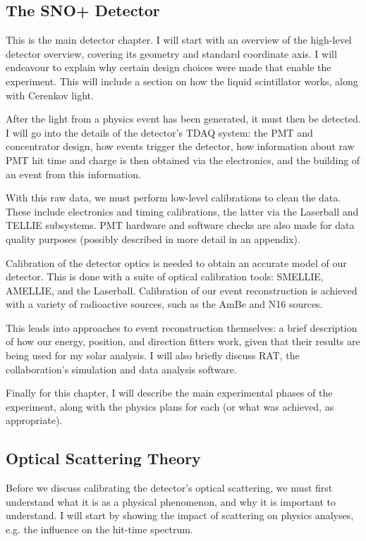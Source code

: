 \subsection{The SNO+ Detector}
This is the main detector chapter. I will start with an overview of the high-level detector overview, covering its geometry and standard coordinate axis. I will endeavour to explain why certain design choices were made that enable the experiment. This will include a section on how the liquid scintillator works, along with Cerenkov light.

After the light from a physics event has been generated, it must then be detected. I will go into the details of the detector's TDAQ system: the PMT and concentrator design, how events trigger the detector, how information about raw PMT hit time and charge is then obtained via the electronics, and the building of an event from this information.

With this raw data, we must perform low-level calibrations to clean the data. These include electronics and timing calibrations, the latter via the Laserball and TELLIE subsystems. PMT hardware and software checks are also made for data quality purposes (possibly described in more detail in an appendix).

Calibration of the detector optics is needed to obtain an accurate model of our detector. This is done with a suite of optical calibration tools: SMELLIE, AMELLIE, and the Laserball. Calibration of our event reconstruction is achieved with a variety of radioactive sources, such as the AmBe and N16 sources.

This leads into approaches to event reconstruction themselves: a brief description of how our energy, position, and direction fitters work, given that their results are being used for my solar analysis. I will also briefly discuss RAT, the collaboration's simulation and data analysis software.

Finally for this chapter, I will describe the main experimental phases of the experiment, along with the physics plans for each (or what was achieved, as appropriate).

\subsection{Optical Scattering Theory}
Before we discuss calibrating the detector's optical scattering, we must first understand what it is as a physical phenomenon, and why it is important to understand. I will start by showing the impact of scattering on physics analyses, e.g. the influence on the hit-time spectrum.

